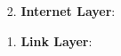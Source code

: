 \begin{enumerate}

    \item[2.] \textbf{Internet Layer}: 
    

    \item[1.] \textbf{Link Layer}: 
    

\end{enumerate}

